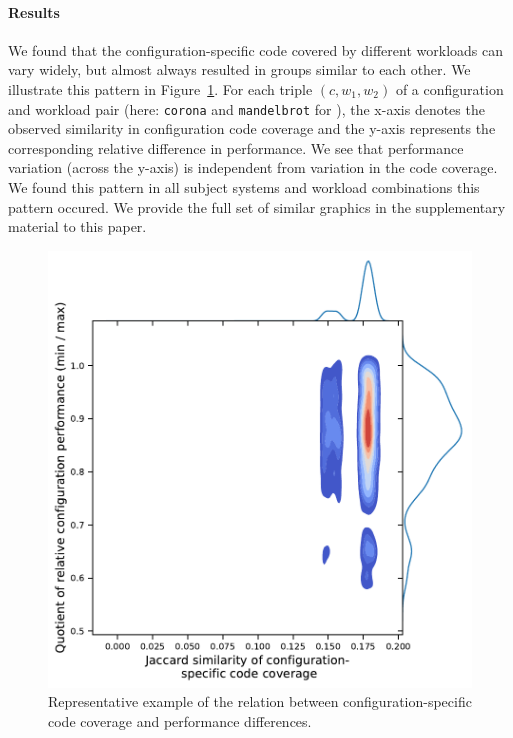 \paragraph*{Results}
We found that the configuration-specific code covered by different workloads can vary widely, but almost always resulted in groups similar to each other. We illustrate this pattern in Figure~\ref{fig:example_coverage_performance}. For each triple $(c, w_1, w_2)$ of a configuration and workload pair (here: \texttt{corona} and \texttt{mandelbrot} for \batik), the x-axis denotes the observed similarity in configuration code coverage and the y-axis represents the corresponding relative difference in performance. We see that performance variation (across the y-axis) is independent from variation in the code coverage. We found this pattern in all subject systems and workload combinations this pattern occured. We provide the full set of similar graphics in the supplementary material to this paper.
\vspace{1em}	

\begin{figure}
	\centering
	\includegraphics[width=0.98\linewidth]{images/configuration_coverage_corona_mandelbrot.pdf}
	\caption{Representative example of the relation between configuration-specific code coverage and performance differences.}
	\label{fig:example_coverage_performance}
\end{figure}

